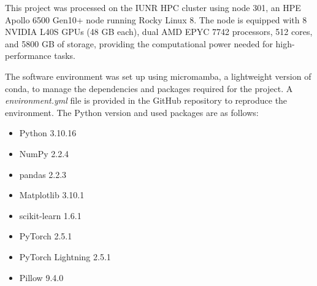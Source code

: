     This project was processed on the IUNR HPC cluster using node 301, an HPE Apollo 6500 Gen10+ node running Rocky Linux 8. 
    The node is equipped with 8 NVIDIA L40S GPUs (48 GB each), dual AMD EPYC 7742 processors, 512 cores, and 5800 GB of storage, providing the computational power needed for high-performance tasks.

    The software environment was set up using micromamba, a lightweight version of conda, to manage the dependencies and packages required for the project.
    A \textit{environment.yml} file is provided in the GitHub repository to reproduce the environment.
    The Python version and used packages are as follows:

    \begin{itemize}
        \item Python 3.10.16
        \item NumPy 2.2.4
        \item pandas 2.2.3
        \item Matplotlib 3.10.1
        \item scikit-learn 1.6.1
        \item PyTorch 2.5.1
        \item PyTorch Lightning 2.5.1
        \item Pillow 9.4.0
    \end{itemize}


